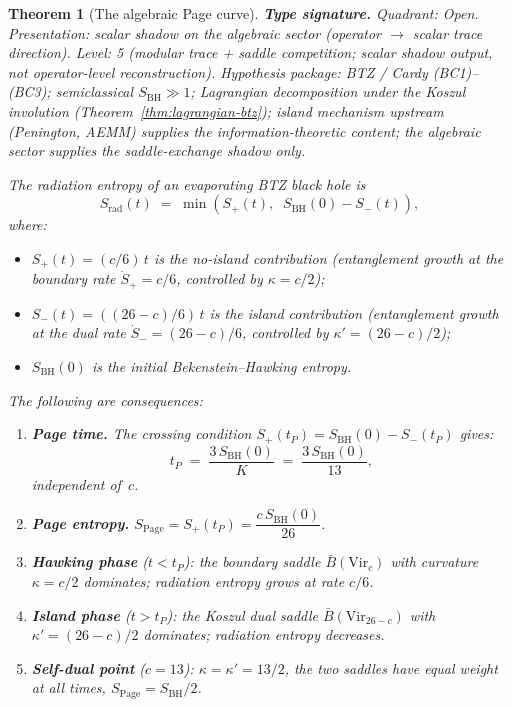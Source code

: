 \documentclass[11pt,reqno]{amsart}
\newtheorem{theorem}{Theorem}[section]
\theoremstyle{definition}
\theoremstyle{remark}
\providecommand{\barB}{\bar{B}}
\begin{document}
\begin{theorem}[The algebraic Page curve]
\label{thm:page-curve}
\textbf{Type signature.} Quadrant: Open.
Presentation: scalar shadow on the algebraic sector (operator
$\to$ scalar trace direction).
Level: 5 (modular trace + saddle competition; scalar shadow
output, not operator-level reconstruction).
Hypothesis package: BTZ / Cardy (BC1)--(BC3); semiclassical
$S_{\mathrm{BH}} \gg 1$; Lagrangian decomposition under the
Koszul involution (Theorem~\ref{thm:lagrangian-btz}); island
mechanism upstream (Penington, AEMM) supplies the
information-theoretic content; the algebraic sector supplies the
saddle-exchange shadow only.

The radiation entropy of an evaporating BTZ black hole is
\begin{equation}\label{eq:page-curve-formula}
S_{\mathrm{rad}}(t)
\;=\;
\min\!\left(
 S_+(t),\;\;
 S_{\mathrm{BH}}(0) - S_-(t)
\right)\!,
\end{equation}
where:
\begin{itemize}
\item $S_+(t) = (c/6)\,t$ is the no-island contribution
  (entanglement growth at the boundary rate $\dot{S}_+ = c/6$,
  controlled by $\kappa = c/2$);
\item $S_-(t) = ((26-c)/6)\,t$ is the island contribution
  (entanglement growth at the dual rate $\dot{S}_- = (26-c)/6$,
  controlled by $\kappa' = (26-c)/2$);
\item $S_{\mathrm{BH}}(0)$ is the initial Bekenstein--Hawking
  entropy.
\end{itemize}
The following are consequences:
\begin{enumerate}[label=\textup{(\roman*)}]
\item \textbf{Page time.}
  The crossing condition
  $S_+(t_P) = S_{\mathrm{BH}}(0) - S_-(t_P)$ gives:
  \begin{equation}\label{eq:page-time}
  t_P \;=\;
  \frac{3\,S_{\mathrm{BH}}(0)}{K}
  \;=\;
  \frac{3\,S_{\mathrm{BH}}(0)}{13},
  \end{equation}
  independent of~$c$.
\item \textbf{Page entropy.}
  $S_{\mathrm{Page}} = S_+(t_P)
  = \dfrac{c\,S_{\mathrm{BH}}(0)}{26}$.
\item \textbf{Hawking phase} ($t < t_P$):
  the boundary saddle $\barB(\mathrm{Vir}_c)$ with curvature
  $\kappa = c/2$ dominates; radiation
  entropy grows at rate $c/6$.
\item \textbf{Island phase} ($t > t_P$):
  the Koszul dual saddle $\barB(\mathrm{Vir}_{26-c})$ with
  $\kappa' = (26-c)/2$ dominates; radiation entropy
  decreases.
\item \textbf{Self-dual point} ($c = 13$):
  $\kappa = \kappa' = 13/2$, the two saddles have equal
  weight at all times,
  $S_{\mathrm{Page}} = S_{\mathrm{BH}}/2$.
\end{enumerate}
\end{theorem}
\end{document}
